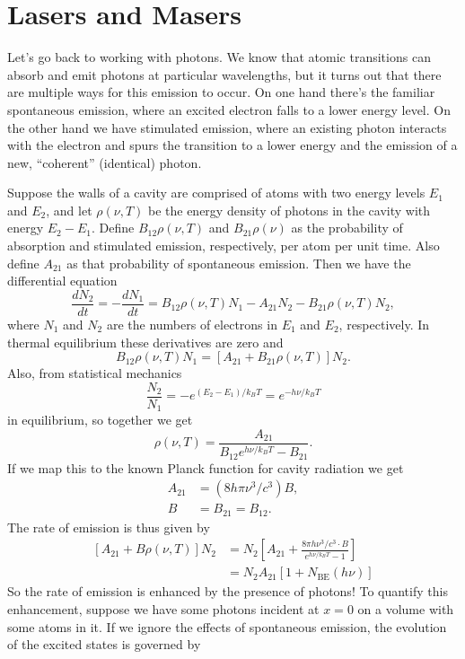 \documentclass[../p052main.tex]{subfiles}
\begin{document}
\section{Lasers and Masers}
Let's go back to working with photons.
We know that atomic transitions can absorb and emit photons at particular wavelengths, but it turns out that there are multiple ways for this emission to occur.
On one hand there's the familiar spontaneous emission, where an excited electron falls to a lower energy level.
On the other hand we have stimulated emission, where an existing photon interacts with the electron and spurs the transition to a lower energy and the emission of a new, ``coherent'' (identical) photon.

Suppose the walls of a cavity are comprised of atoms with two energy levels $E_1$ and $E_2$, and let $\rho(\nu,T)$ be the energy density of photons in the cavity with energy $E_2-E_1$.
Define $B_{12} \rho(\nu,T)$ and $B_{21} \rho(\nu)$ as the probability of absorption and stimulated emission, respectively, per atom per unit time.
Also define $A_{21}$ as that probability of spontaneous emission.
Then we have the differential equation
\[ \frac{dN_2}{dt} = -\frac{dN_1}{dt} = B_{12} \rho(\nu, T) N_1 - A_{21} N_2 - B_{21}\rho(\nu,T)N_2, \]
where $N_1$ and $N_2$ are the numbers of electrons in $E_1$ and $E_2$, respectively.
In thermal equilibrium these derivatives are zero and
\[ B_{12} \rho(\nu,T) N_1 = [A_{21} + B_{21} \rho(\nu,T)] N_2. \]
Also, from statistical mechanics
\[ \frac{N_2}{N_1} = -e^{(E_2 - E_1) / k_BT} = e^{-h\nu / k_BT} \]
in equilibrium, so together we get
\[ \rho(\nu,T) = \frac{A_{21}}{B_{12} e^{h\nu / k_BT} - B_{21}}. \]
If we map this to the known Planck function for cavity radiation we get
\begin{align*}
    A_{21} &= (8h\pi \nu^3 / c^3) B, \\
    B &= B_{21} = B_{12}.
\end{align*}
The rate of emission is thus given by
\begin{align*}
    \left[ A_{21} + B \rho(\nu,T) \right] N_2 &= N_2 \left[ A_{21} + \frac{8\pi h\nu^3 / c^3 \cdot B}{e^{h\nu / k_BT} - 1} \right] \\
    &= N_2 A_{21} \left[ 1 + N_\textrm{BE}(h\nu) \right]
\end{align*}
So the rate of emission is enhanced by the presence of photons!
To quantify this enhancement, suppose we have some photons incident at $x=0$ on a volume with some atoms in it.
If we ignore the effects of spontaneous emission, the evolution of the excited states is governed by
\end{document}

